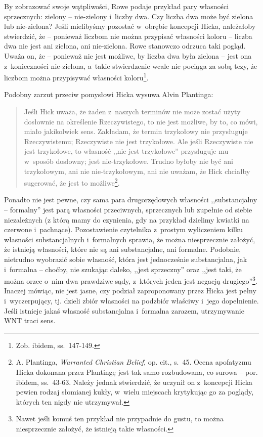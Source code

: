 By zobrazować swoje wątpliwości, Rowe podaje przykład pary własności sprzecznych: zielony -- nie-zielony i~liczby dwa. Czy liczba dwa może być zielona lub nie-zielona? Jeśli mielibyśmy pozostać w~obrębie koncepcji Hicka, należałoby stwierdzić, że -- ponieważ liczbom nie można przypisać własności koloru -- liczba dwa nie jest ani zielona, ani nie-zielona. Rowe stanowczo odrzuca taki pogląd. Uważa on, że -- ponieważ nie jest możliwe, by liczba dwa była zielona -- jest ona z~konieczności nie-zielona, a~takie stwierdzenie wcale nie pociąga za sobą tezy, że liczbom można przypisywać własności koloru\footnote{Zob. ibidem, ss.~147-149.}.

Podobny zarzut przeciw pomysłowi Hicka wysuwa Alvin Plantinga:

\begin{quote}
Jeśli Hick uważa, że żaden z~naszych terminów nie może zostać użyty dosłownie na określenie Rzeczywistego, to nie jest możliwe, by to, co mówi, miało jakikolwiek sens. Zakładam, że termin trzykołowy nie przysługuje Rzeczywistemu; Rzeczywiste nie jest trzykołowe. Ale jeśli Rzeczywiste nie jest trzykołowe, to własność ,,nie jest trzykołowe'' przysługuje mu w~sposób dosłowny; jest nie-trzykołowe. Trudno byłoby nie być ani trzykołowym, ani nie nie-trzykołowym, ani nie uważam, że Hick chciałby sugerować, że jest to możliwe\footnote{A. Plantinga, \textit{Warranted Christian Belief}, op. cit., s.~45. Ocena apofatyzmu Hicka dokonana przez Plantingę jest tak samo rozbudowana, co surowa -- por. ibidem, ss.~43-63. Należy jednak stwierdzić, że uczynił on z~koncepcji Hicka pewien rodzaj słomianej kukły, w~wielu miejscach krytykując go za poglądy, których ten nigdy nie utrzymywał.}.
\end{quote}

Ponadto nie jest pewne, czy sama para drugorzędowych własności ,,substancjalny -- formalny'' jest parą własności przeciwnych, sprzecznych lub zupełnie od siebie niezależnych (z którą mamy do czynienia, gdy na przykład dzielimy kwiatki na czerwone i~pachnące). Pozostawienie czytelnika z~prostym wyliczeniem kilku własności substancjalnych i~formalnych sprawia, że można niesprzecznie założyć, że istnieją własności, które nie są ani substancjalne, ani formalne. Podobnie, nietrudno wyobrazić sobie własność, która jest jednocześnie substancjalna, jak i~formalna -- choćby, nie szukając daleko, ,,jest sprzeczny'' oraz ,,jest taki, że można orzec o~nim dwa prawdziwe sądy, z~których jeden jest negacją drugiego''\footnote{Nawet jeśli komuś ten przykład nie przypadnie do gustu, to można niesprzecznie założyć, że istnieją takie własności.}. Inaczej mówiąc, nie jest jasne, czy podział zaproponowany przez Hicka jest pełny i~wyczerpujący, tj. dzieli zbiór własności na podzbiór właściwy i~jego dopełnienie. Jeśli istnieje jakaś własność substancjalna i~formalna zarazem, utrzymywanie WNT traci sens.

